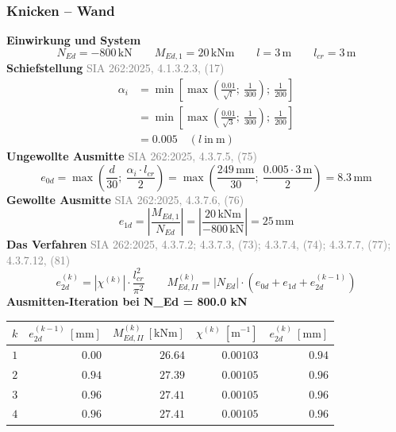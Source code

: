 \documentclass[11pt,a4paper]{article}
\newcommand{\normref}[1]{{\small\textcolor{gray}{#1}}}
\begin{document}
\subsubsection{Knicken – Wand}
\noindent\textbf{Einwirkung und System}
\begin{equation*}
N_{Ed} = -800\,\mathrm{kN} \qquad M_{Ed,1} = 20\,\mathrm{kNm} \qquad l = 3\,\mathrm{m} \qquad l_{cr} = 3\,\mathrm{m}
\end{equation*}
\noindent\textbf{Schiefstellung} \hfill \normref{SIA 262:2025, 4.1.3.2.3, (17)}
\begin{equation*}
\begin{aligned}
  \alpha_i &= \min\left[\max\left(\frac{0.01}{\sqrt{l}};\ \frac{1}{300}\right);\ \frac{1}{200}\right] \\
  &= \min\left[\max\left(\frac{0.01}{\sqrt{3}};\ \frac{1}{300}\right);\ \frac{1}{200}\right] \\
  &= 0.005 \quad \left(l\ \text{in}\ \mathrm{m}\right)
\end{aligned}
\end{equation*}
\noindent\textbf{Ungewollte Ausmitte} \hfill \normref{SIA 262:2025, 4.3.7.5, (75)}
\begin{equation*}
e_{0d} = \max\left(\frac{d}{30};\ \frac{\alpha_i \cdot l_{cr}}{2}\right) = \max\left(\frac{249\,\mathrm{mm}}{30};\ \frac{0.005 \cdot 3\,\mathrm{m}}{2}\right) = 8.3\,\mathrm{mm}
\end{equation*}
\noindent\textbf{Gewollte Ausmitte} \hfill \normref{SIA 262:2025, 4.3.7.6, (76)}
\begin{equation*}
e_{1d} = \left|\frac{M_{Ed,1}}{N_{Ed}}\right| = \left|\frac{20\,\mathrm{kNm}}{-800\,\mathrm{kN}}\right| = 25\,\mathrm{mm}
\end{equation*}
\noindent\textbf{Das Verfahren} \hfill \normref{SIA 262:2025, 4.3.7.2; 4.3.7.3, (73); 4.3.7.4, (74); 4.3.7.7, (77); 4.3.7.12, (81)}
\begin{equation*}
e_{2d}^{(k)} = \left|\chi^{(k)}\right| \cdot \frac{l_{cr}^{2}}{\pi^{2}} \qquad M_{Ed,II}^{(k)} = \left|N_{Ed}\right| \cdot \left(e_{0d} + e_{1d} + e_{2d}^{(k-1)}\right)
\end{equation*}
\noindent\textbf{Ausmitten-Iteration bei N\_Ed = 800.0 kN}
\begin{longtable}{rrrrr}
\hline
$k$ & $e_{2d}^{(k-1)}\ [\mathrm{mm}]$ & $M_{Ed,II}^{(k)}\ [\mathrm{kNm}]$ & $\chi^{(k)}\ [\mathrm{m}^{-1}]$ & $e_{2d}^{(k)}\ [\mathrm{mm}]$ \\
\hline
\endhead
$1$ & $0.00$ & $26.64$ & $0.00103$ & $0.94$ \\
$2$ & $0.94$ & $27.39$ & $0.00105$ & $0.96$ \\
$3$ & $0.96$ & $27.41$ & $0.00105$ & $0.96$ \\
$4$ & $0.96$ & $27.41$ & $0.00105$ & $0.96$ \\
\hline
\end{longtable}
\end{document}
